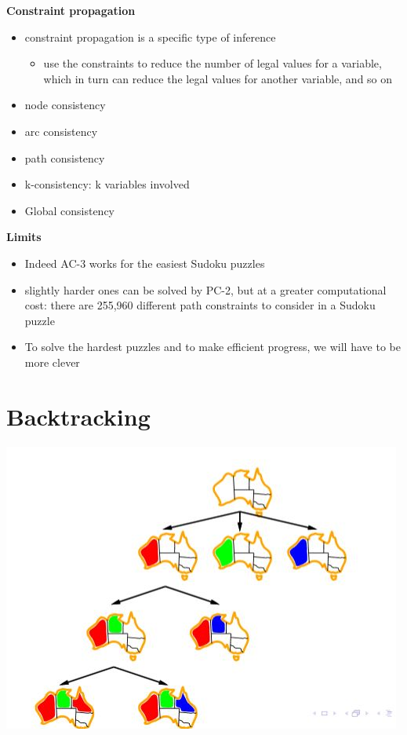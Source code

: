 \textbf{Constraint propagation}
\begin{itemize}
\item constraint propagation is a specific type of inference 
\begin{itemize}
\item use the constraints to reduce the number of legal values for a variable, which in turn can reduce the legal values for another variable, and so on
\end{itemize}

\item node consistency
\item arc consistency
\item path consistency 
\item k-consistency: k variables involved
\item Global consistency 

\end{itemize}

\textbf{Limits}
\begin{itemize}
\item Indeed AC-3 works for the easiest Sudoku puzzles
\item slightly harder ones can be solved by PC-2, but at a greater computational cost: there are 255,960 
different path constraints to consider in a Sudoku puzzle
\item To solve the hardest puzzles and to make efficient progress, we will have to be more clever 

\end{itemize}

\section{Backtracking}
\includegraphics[scale=1]{chap1_pics/backtracking.jpeg} 

